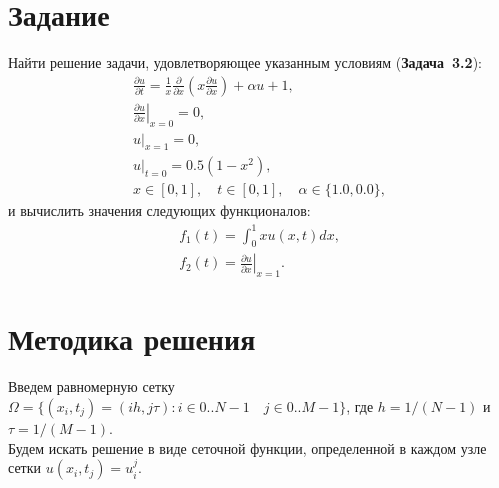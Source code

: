 \documentclass[a4paper,12pt]{article}
\newcommand{\UpdateMe}[1]{\textcolor{red}{#1}}
\newcommand{\University}{Московский государственный университет имени М.~В.~Ломоносова}
\newcommand{\Department}{Кафедра \UpdateMe{НАЗВАНИЕ-КАФЕДРЫ}}
\newcommand{\Student}{\UpdateMe{ИМЯ-СТУДЕНТА}}
\newcommand{\GroupNum}{\UpdateMe{НОМЕР}}
\newcommand{\Seminar}{\UpdateMe{НАЗВАНИЕ-ПРАКТИКУМА}}
\begin{document}

\section*{Задание}
Найти решение задачи, удовлетворяющее указанным условиям ({\bfseries Задача~3.2}):
\begin{gather*}
  \frac{\partial u}{\partial t}=\frac{1}{x} \frac{\partial}{\partial x}\left(x \frac{\partial u}{\partial x}\right) + \alpha u + 1,\\
  \left.\frac{\partial u}{\partial x}\right\vert_{x=0}=0,\\
  \left.u\right\vert_{x=1}=0,\\
  \left.u\right\vert_{t=0}=0.5(1-x^2),\\
  x \in [0, 1], \quad t \in [0, 1], \quad \alpha \in \{1.0, 0.0\},
\end{gather*}
и вычислить значения следующих функционалов:
\begin{gather*}
  f_1(t) = \int_{0}^{1}{x u(x, t) dx},\\
  f_2(t) = \left.\frac{\partial u}{\partial x}\right\vert_{x=1}.
\end{gather*}

\section*{Методика решения}

Введем равномерную сетку \(\Omega=\{(x_{i}, t_{j})=(ih, j\tau): i \in 0..N-1 \quad j\in 0..M-1\}\), где \(h=1/(N-1)\) и \(\tau=1/(M-1)\).\\
Будем искать решение в виде сеточной функции, определенной в каждом узле сетки \(u(x_{i},t_{j})=u_{i}^{j}\).
\end{document}
